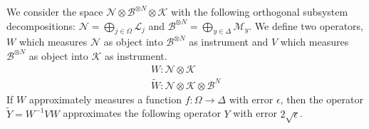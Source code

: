 \begin{theorem}
We consider the space
$\mathcal{N} \otimes \mathcal{B}^{\otimes N} \otimes \mathcal{K}$ with the
following orthogonal subsystem decompositions:
$\mathcal{N} = \bigoplus_{j \in \Omega} \mathcal{L}_j$ and
$\mathcal{B}^{\otimes N} = \bigoplus_{y \in \Delta} \mathcal{M}_y$. We
define two operators, $W$ which measures $\mathcal{N}$ as object into
$\mathcal{B}^{\otimes N}$ as instrument and $V$ which measures
$\mathcal{B}^{\otimes N}$ as object into $\mathcal{K}$ as instrument.
%
\begin{eqnarray}
W : \mathcal{N} \otimes \mathcal{K}\\
\tilde{W} : \mathcal{N} \otimes \mathcal{K} \otimes \mathcal{B}^N
\end{eqnarray}
%
If $W$ approximately measures a function $f : \Omega \rightarrow \Delta$
with error $\epsilon$, then the operator $\tilde{Y} = W^{-1}VW$ approximates
the following operator $Y$ with error $2\sqrt{\epsilon}$.
\label{thm:coherent}
\end{theorem}

